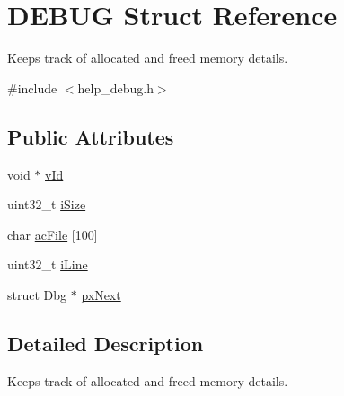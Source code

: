 \hypertarget{structDEBUG}{\section{D\-E\-B\-U\-G Struct Reference}
\label{structDEBUG}
}


Keeps track of allocated and freed memory details.  




{\ttfamily \#include $<$help\-\_\-debug.\-h$>$}

\subsection*{Public Attributes}
\begin{DoxyCompactItemize}
\item 
void $\ast$ \hyperlink{structDEBUG_ae273fbad6ce7ff3df56041bdbc98d119}{v\-Id}
\item 
uint32\-\_\-t \hyperlink{structDEBUG_a8a4025e8fccfbbf95c3568789d3690a6}{i\-Size}
\item 
char \hyperlink{structDEBUG_a398250c97a7a65717049ce5dd515eba2}{ac\-File} \mbox{[}100\mbox{]}
\item 
uint32\-\_\-t \hyperlink{structDEBUG_a50c914ade034df26663794c6a54b6a58}{i\-Line}
\item 
struct Dbg $\ast$ \hyperlink{structDEBUG_a8e59a4facf10cd60c28bf77bc2ab9e1e}{px\-Next}
\end{DoxyCompactItemize}


\subsection{Detailed Description}
Keeps track of allocated and freed memory details. 

